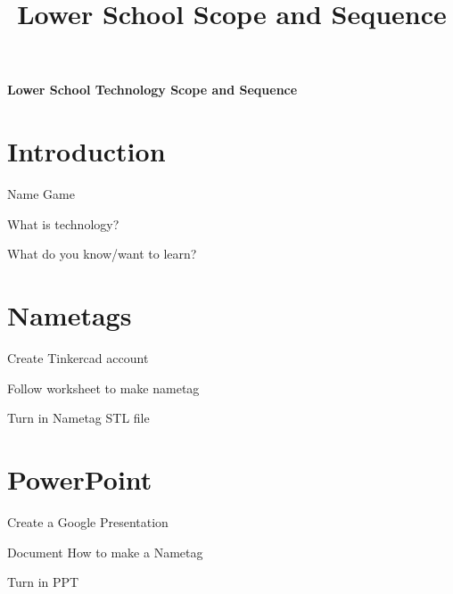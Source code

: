 \documentclass{article}
\def\nametags{Nametags}
\def\ppt{PowerPoint}
\begin{document}
	\title{Lower School Scope and Sequence}
	\begin{titlepage}
		\begin{center}
			\Huge\textbf{Lower School Technology Scope and Sequence}\\
		\end{center}
	\end{titlepage}
	

	\vspace{1cm}
	\section{Introduction}
	\begin{todolist}
		\item Name Game
		\item What is technology?
		\item What do you know/want to learn?
	\end{todolist}
	\section{\nametags}
	\begin{todolist}
		\item Create Tinkercad account
		\item Follow worksheet to make nametag
		\item Turn in Nametag STL file
	\end{todolist}
	\section{\ppt}
	\begin{todolist}
		\item Create a Google Presentation
		\item Document How to make a Nametag
		\item Turn in PPT
	\end{todolist}
\end{document}
